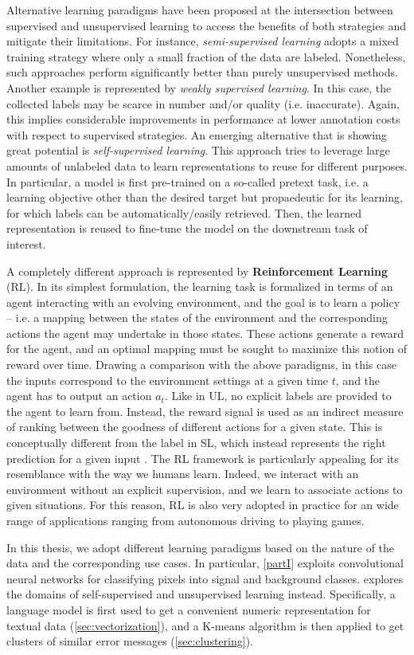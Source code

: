 Alternative learning paradigms have been proposed at the intersection between supervised and unsupervised learning to access the benefits of both strategies and mitigate their limitations.
For instance, \textit{semi-supervised learning} adopts a mixed training strategy where only a small fraction of the data are labeled. Nonetheless, such approaches perform significantly better than purely unsupervised methods.
Another example is represented by \textit{weakly supervised learning}. In this case, the collected labels may be scarce in number and/or quality (i.e. inaccurate). Again, this implies considerable improvements in performance at lower annotation costs with respect to supervised strategies. 
An emerging alternative that is showing great potential is \textit{self-supervised learning}. This approach tries to leverage large amounts of unlabeled data to learn representations to reuse for different purposes. In particular, a model is first pre-trained on a so-called pretext task, i.e. a learning objective other than the desired target but propaedeutic for its learning, for which labels can be automatically/easily retrieved. Then, the learned representation is reused to fine-tune the model on the downstream task of interest.

A completely different approach is represented by \textbf{Reinforcement Learning} (RL). In its simplest formulation, the learning task is formalized in terms of an agent interacting with an evolving environment, and the goal is to learn a policy -- i.e. a mapping between the states of the environment and the corresponding actions the agent may undertake in those states.
These actions generate a reward for the agent, and an optimal mapping must be sought to maximize this notion of reward over time.
Drawing a comparison with the above paradigms, in this case the inputs correspond to the environment settings at a given time $t$, and the agent has to output an action $a_t$.
Like in UL, no explicit labels are provided to the agent to learn from.
Instead, the reward signal is used as an indirect measure of ranking between the goodness of different actions for a given state. This is conceptually different from the label in SL, which instead represents the right prediction for a given input \cite[Chapter 1]{sutton2018reinforcement}.
The RL framework is particularly appealing for its resemblance with the way we humans learn.
Indeed, we interact with an environment without an explicit supervision, and we learn to associate actions to given situations.
For this reason, RL is also very adopted in practice for an wide range of applications ranging from autonomous driving to playing games.

In this thesis, we adopt different learning paradigms based on the nature of the data and the corresponding use cases.
In particular, \cref{partI} exploits convolutional neural networks for classifying pixels into signal and background classes.
 explores the domains of self-supervised and unsupervised learning instead. Specifically, a language model is first used to get a convenient numeric representation for textual data (\cref{sec:vectorization}), and a K-means algorithm is then applied to get clusters of similar error messages (\cref{sec:clustering}).